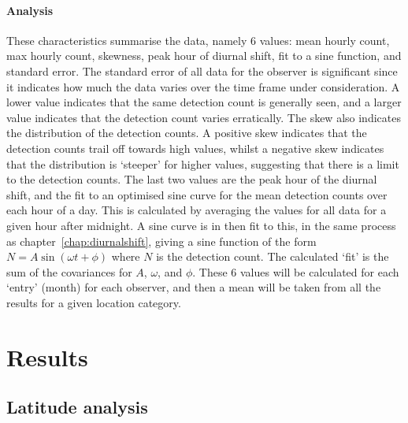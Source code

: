 \paragraph{Analysis\\}
These characteristics summarise the data, namely 6 values: mean hourly count, max hourly count, skewness, peak hour of diurnal shift, fit to a sine function, and standard error. The standard error of all data for the observer is significant since it indicates how much the data varies over the time frame under consideration. A lower value indicates that the same detection count is generally seen, and a larger value indicates that the detection count varies erratically. The skew also indicates the distribution of the detection counts. A positive skew indicates that the detection counts trail off towards high values, whilst a negative skew indicates that the distribution is `steeper' for higher values, suggesting that there is a limit to the detection counts. The last two values are the peak hour of the diurnal shift, and the fit to an optimised sine curve for the mean detection counts over each hour of a day. This is calculated by averaging the values for all data for a given hour after midnight. A sine curve is in then fit to this, in the same process as chapter~\ref{chap:diurnalshift}, giving a sine function of the form $N = A \sin \left( \omega t + \phi \right)$ where $N$ is the detection count. The calculated `fit' is the sum of the covariances for $A$, $\omega$, and $\phi$. 
These 6 values will be calculated for each `entry' (month) for each observer, and then a mean will be taken from all the results for a given location category.

\section{Results}

\subsection{Latitude analysis}
